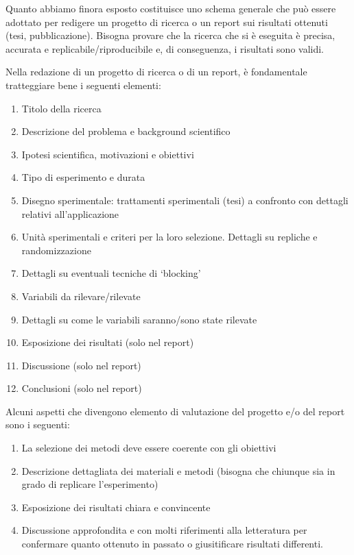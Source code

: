 \documentclass[a4paper,12pt,oneside]{book}
\providecommand{\tightlist}{%
  \setlength{\itemsep}{0pt}\setlength{\parskip}{0pt}}
\begin{document}
Quanto abbiamo finora esposto costituisce uno schema generale che può essere adottato per redigere un progetto di ricerca o un report sui risultati ottenuti (tesi, pubblicazione). Bisogna provare che la ricerca che si è eseguita è precisa, accurata e replicabile/riproducibile e, di conseguenza, i risultati sono validi.

Nella redazione di un progetto di ricerca o di un report, è fondamentale tratteggiare bene i seguenti elementi:

\begin{enumerate}
\def\labelenumi{\arabic{enumi}.}
\tightlist
\item
  Titolo della ricerca
\item
  Descrizione del problema e background scientifico
\item
  Ipotesi scientifica, motivazioni e obiettivi
\item
  Tipo di esperimento e durata
\item
  Disegno sperimentale: trattamenti sperimentali (tesi) a confronto con dettagli relativi all'applicazione
\item
  Unità sperimentali e criteri per la loro selezione. Dettagli su repliche e randomizzazione
\item
  Dettagli su eventuali tecniche di `blocking'
\item
  Variabili da rilevare/rilevate
\item
  Dettagli su come le variabili saranno/sono state rilevate
\item
  Esposizione dei risultati (solo nel report)
\item
  Discussione (solo nel report)
\item
  Conclusioni (solo nel report)
\end{enumerate}

Alcuni aspetti che divengono elemento di valutazione del progetto e/o del report sono i seguenti:

\begin{enumerate}
\def\labelenumi{\arabic{enumi}.}
\tightlist
\item
  La selezione dei metodi deve essere coerente con gli obiettivi
\item
  Descrizione dettagliata dei materiali e metodi (bisogna che chiunque sia in grado di replicare l'esperimento)
\item
  Esposizione dei risultati chiara e convincente
\item
  Discussione approfondita e con molti riferimenti alla letteratura per confermare quanto ottenuto in passato o giusitificare risultati differenti.
\end{enumerate}
\end{document}
